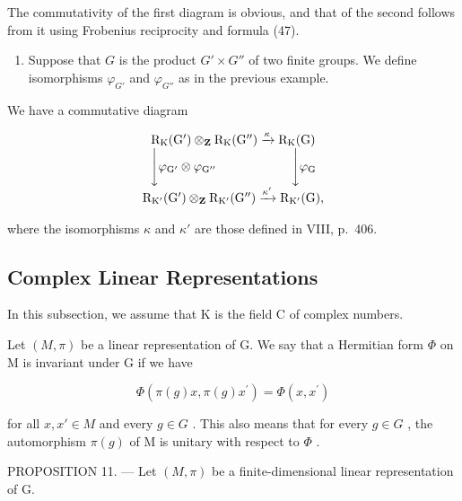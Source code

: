 The commutativity of the first diagram is obvious, and that of the second follows from it using Frobenius reciprocity and formula (47).

\begin{enumerate}
\def\labelenumi{\arabic{enumi})}
\setcounter{enumi}{4}
\tightlist
\item
  Suppose that \(G\) is the product \(G' \times G''\) of two finite groups. We define isomorphisms \(\varphi_{G'}\) and \(\varphi_{G''}\) as in the previous example.
\end{enumerate}

We have a commutative diagram

\[
\begin{array}{c} \mathrm{R} _ {\mathrm{K}} (\mathrm{G} ^ {\prime}) \otimes_ {\mathbf {Z}} \mathrm{R} _ {\mathrm{K}} (\mathrm{G} ^ {\prime \prime}) \xrightarrow {\kappa} \mathrm{R} _ {\mathrm{K}} (\mathrm{G}) \\ \Biggl \downarrow \varphi_ {\mathrm{G} ^ {\prime}} \otimes \varphi_ {\mathrm{G} ^ {\prime \prime}} \qquad \qquad \qquad \Biggl \downarrow \varphi_ {\mathrm{G}} \\ \mathrm{R} _ {\mathrm{K} ^ {\prime}} (\mathrm{G} ^ {\prime}) \otimes_ {\mathbf {Z}} \mathrm{R} _ {\mathrm{K} ^ {\prime}} (\mathrm{G} ^ {\prime \prime}) \xrightarrow {\kappa^ {\prime}} \mathrm{R} _ {\mathrm{K} ^ {\prime}} (\mathrm{G})  , \end{array}
\]

where the isomorphisms \(\kappa\) and \(\kappa'\) are those defined in VIII, p.~406.

\subsection{Complex Linear Representations}

In this subsection, we assume that K is the field C of complex numbers.

Let \((M,\pi)\) be a linear representation of G. We say that a Hermitian form \(\Phi\) on M is invariant under G if we have

\[
\Phi (\pi (g) x, \pi (g) x ^ {\prime}) = \Phi (x, x ^ {\prime})\tag{48}
\]

for all \(x, x' \in M\) and every \(g \in G\) . This also means that for every \(g \in G\) , the automorphism \(\pi(g)\) of M is unitary with respect to \(\Phi\) .

PROPOSITION 11. --- Let \((M,\pi)\) be a finite-dimensional linear representation of G.

